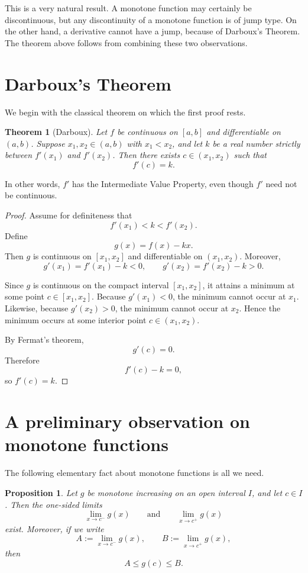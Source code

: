 \documentclass[11pt,a4paper]{amsart}
\newtheorem{theorem}{Theorem}
\newtheorem{proposition}{Proposition}
\theoremstyle{remark}
\begin{document}
This is a very natural result.
A monotone function may certainly be discontinuous, but any discontinuity of a monotone function is of jump type.
On the other hand, a derivative cannot have a jump, because of Darboux's Theorem.
The theorem above follows from combining these two observations.

\section{Darboux's Theorem}

We begin with the classical theorem on which the first proof rests.

\begin{theorem}[Darboux]\label{thm:darboux}
Let $f$ be continuous on $[a,b]$ and differentiable on $(a,b)$.
Suppose $x_1,x_2\in(a,b)$ with $x_1<x_2$, and let $k$ be a real number
strictly between $f'(x_1)$ and $f'(x_2)$.
Then there exists $c\in(x_1,x_2)$ such that
\[
f'(c)=k.
\]
\end{theorem}

In other words, $f'$ has the Intermediate Value Property, even though $f'$ need not be continuous.

\begin{proof}
Assume for definiteness that
\[
f'(x_1)<k<f'(x_2).
\]
Define
\[
g(x)=f(x)-kx.
\]
Then $g$ is continuous on $[x_1,x_2]$ and differentiable on $(x_1,x_2)$.
Moreover,
\[
g'(x_1)=f'(x_1)-k<0,
\qquad
g'(x_2)=f'(x_2)-k>0.
\]

Since $g$ is continuous on the compact interval $[x_1,x_2]$, it attains a minimum at some point $c\in[x_1,x_2]$.
Because $g'(x_1)<0$, the minimum cannot occur at $x_1$.
Likewise, because $g'(x_2)>0$, the minimum cannot occur at $x_2$.
Hence the minimum occurs at some interior point $c\in(x_1,x_2)$.

By Fermat's theorem,
\[
g'(c)=0.
\]
Therefore
\[
f'(c)-k=0,
\]
so $f'(c)=k$.
\end{proof}

\section{A preliminary observation on monotone functions}

The following elementary fact about monotone functions is all we need.

\begin{proposition}\label{prop:monotone-limits}
Let $g$ be monotone increasing on an open interval $I$, and let $c\in I$.
Then the one-sided limits
\[
\lim_{x\to c^-}g(x)
\qquad\text{and}\qquad
\lim_{x\to c^+}g(x)
\]
exist.
Moreover, if we write
\[
A:=\lim_{x\to c^-}g(x),
\qquad
B:=\lim_{x\to c^+}g(x),
\]
then
\[
A\le g(c)\le B.
\]
\end{proposition}
\end{document}
